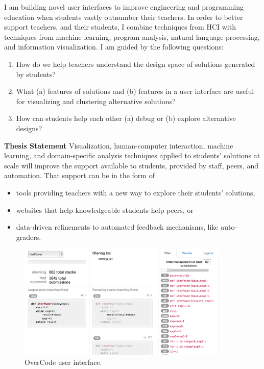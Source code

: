 \documentclass{sigchi}
\begin{document}
I am building novel user interfaces to improve engineering and programming education when students vastly outnumber their teachers. In order to better support teachers, and their students, I combine techniques from HCI with techniques from machine learning, program analysis, natural language processing, and information visualization. I am guided by the following questions:
\begin{enumerate}
\item How do we help teachers understand the design space of solutions generated by students?
\item What (a) features of solutions and (b) features in a user interface are useful for visualizing and clustering alternative solutions?
\item How can students help each other (a) debug or (b) explore alternative designs?
\end{enumerate}

{\bf Thesis Statement} Visualization, human-computer interaction, machine learning, and domain-specific analysis techniques applied to students' solutions at scale will improve the support available to students, provided by staff, peers, and automation. That support can be in the form of 
\begin{itemize}
\item tools providing teachers with a new way to explore their students' solutions,
\item websites that help knowledgeable students help peers, or 
\item data-driven refinements to automated feedback mechanisms, like auto-graders. 
\end{itemize}

\begin{figure}[t!]
\centering
\includegraphics[width=0.9\textwidth]{frontPageInterfacePreview.png}
\caption{OverCode user interface.}
\label{fig:figure1}
\end{figure}
\end{document}
